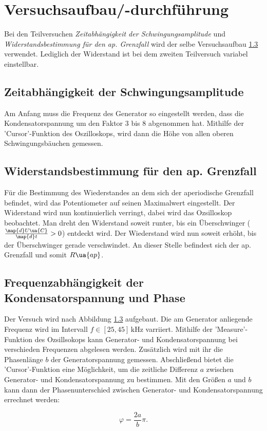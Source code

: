 \section{Versuchsaufbau/-durchführung}

Bei den Teilversuchen \emph{Zeitabhängigkeit der Schwingungsamplitude}
und \emph{Widerstandsbestimmung für den ap. Grenzfall} wird der selbe
Versuchsaufbau \ref{} verwendet. Lediglich der Widerstand ist bei dem
zweiten Teilversuch variabel einstellbar.

\subsection{Zeitabhängigkeit der Schwingungsamplitude}

Am Anfang muss die Frequenz des Generator
so eingestellt werden, dass die Kondensatorspannung um den Faktor $3$ bis $8$
abgenommen hat. Mithilfe der 'Cursor'-Funktion des Oszilloskops, wird dann
die Höhe von allen oberen Schwingungsbäuchen gemessen.

\subsection{Widerstandsbestimmung für den ap. Grenzfall}

Für die Bestimmung des Wiederstandes an dem sich
der aperiodische Grenzfall befindet, wird das Potentiometer
auf seinen Maximalwert eingestellt.
Der Widerstand wird nun kontinuierlich verringt, dabei wird das
Ozsilloskop beobachtet. Man dreht den Widerstand soweit runter, bis
ein Überschwinger ($\frac{\map{d}U\ua{C}}{\map{d}t}>0$) entdeckt wird.
Der Wiederstand wird nun soweit erhöht, bis der Überschwinger gerade verschwindet.
An dieser Stelle befindest sich der ap. Grenzfall und somit $R\ua{ap}$.

\subsection{Frequenzabhängigkeit der Kondensatorspannung und Phase}

Der Versuch wird nach Abbildung \ref{} aufgebaut.
Die am Generator anliegende Frequenz wird im Intervall $f\in\left[25,45\right]\,\si{\kilo\hertz}$
varriiert. Mithilfe der 'Measure'-Funktion des Ozsillsokops
kann Generator- und Kondensatorspannung bei verschieden Frequenzen
abgelesen werden. Zusätzlich wird mit ihr die Phasenlänge $b$ der Generatorspannung
gemessen. Abschließend bietet die 'Cursor'-Funktion eine Möglichkeit, um
die zeitliche Differenz $a$ zwischen Generator- und Kondensatorspannung zu
bestimmen.
Mit den Größen $a$ und $b$ kann dann der Phasenunterschied zwischen
Generator- und Kondensatorspannung errechnet werden:

\begin{equation}
  \label{eq:phasen_unterschied}
  \varphi=\frac{2a}{b}\pi.
\end{equation}
